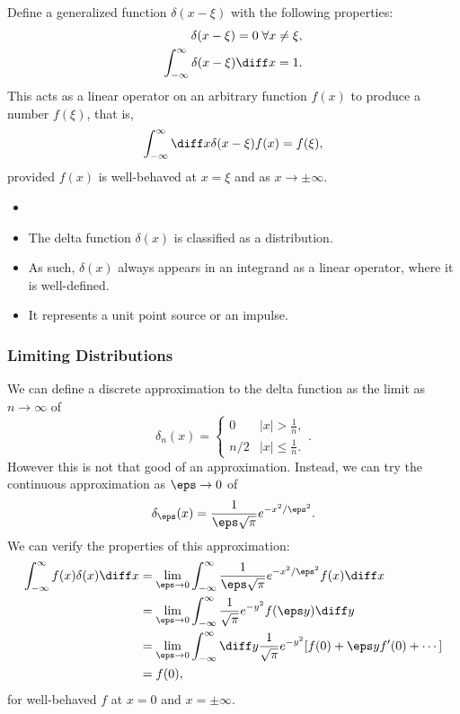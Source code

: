 \documentclass[12pt]{article}
\begin{document}
Define a generalized function $\delta(x - \xi)$ with the following properties:
\begin{align*}
	\delta(x - \xi) = 0\; \forall x \neq \xi, \\
	\int_{-\infty}^{\infty}\delta(x - \xi)\diff x = 1.
\end{align*}
This acts as a linear operator on an arbitrary function $f(x)$ to produce a number $f(\xi)$, that is,
\[
	\int_{-\infty}^{\infty} \diff x \delta(x - \xi) f(x) = f(\xi)
,\]
provided $f(x)$ is well-behaved at $x = \xi$ and as $x \to \pm \infty$.

\begin{remark}
	\begin{itemize}
		\item[]
		\item The delta function $\delta(x)$ is classified as a distribution. 
		\item As such, $\delta(x)$ always appears in an integrand as a linear operator, where it is well-defined.
		\item It represents a unit point source or an impulse.
	\end{itemize}
\end{remark}

\subsubsection{Limiting Distributions}%
\label{subsub:limiting_distributions}

We can define a discrete approximation to the delta function as the limit as $n \to \infty$ of
\[
	\delta_n(x) =
	\begin{cases}
		0 & |x| > \frac{1}{n}, \\
		n/2 & |x| \leq \frac{1}{n}.
	\end{cases}
.\]
However this is not that good of an approximation. Instead, we can try the continuous approximation as $\eps \to 0$ of
\[
	\delta_{\eps}(x) = \frac{1}{\eps \sqrt \pi} e^{-x^2/\eps^2}
.\]
We can verify the properties of this approximation:
\begin{align*}
	\int_{-\infty}^{\infty}f(x) \delta(x) \diff x &= \lim_{\eps \to 0} \int_{-\infty}^{\infty} \frac{1}{\eps \sqrt \pi} e^{-x^2/\eps^2} f(x) \diff x \\
						      &= \lim_{\eps \to 0}\int_{-\infty}^{\infty}\frac{1}{\sqrt \pi} e^{-y^2}f(\eps y) \diff y \\
						      &= \lim_{\eps \to 0} \int_{-\infty}^{\infty} \diff y \frac{1}{\sqrt \pi} e^{-y^2} [f(0) + \eps y f'(0) + \cdots] \\
						      &= f(0),
\end{align*}
for well-behaved $f$ at $x = 0$ and $x = \pm \infty$.
\end{document}
